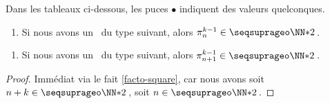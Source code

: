 \begin{fact} \label{sftab-recu}
	Dans les tableaux ci-dessous, les puces $\bullet$ indiquent des valeurs quelconques.

	\begin{enumerate}
		\item Si nous avons un \sftab\ du type suivant, alors $\consprod<k-1> \in \NNssquare$\,.
	\end{enumerate}

	\begin{center}
	\end{center}


	\begin{enumerate}[start=2]
		\item Si nous avons un \sftab\ du type suivant, alors $\consprod[n+1]<k-1> \in \NNssquare$\,.
	\end{enumerate}

	\begin{center}
	\end{center}
\end{fact}


\begin{proof}
	Immédiat via le fait \ref{facto-square}, car nous avons soit $n + k \in \NNssquare$\,, soit $n \in \NNssquare$\,.
\end{proof}




